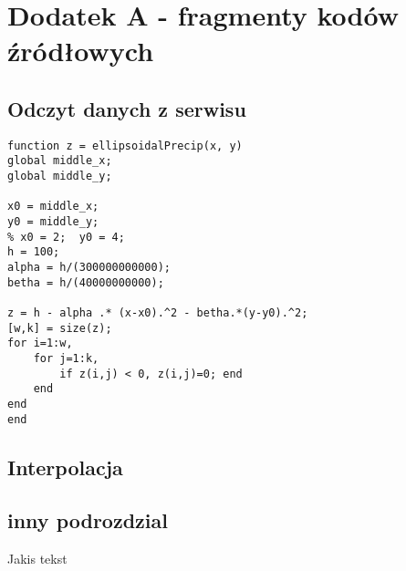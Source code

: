 \chapter{Dodatek A - fragmenty kodów źródłowych}
\label{cha:dodatek_A}
\section{Odczyt danych z serwisu}

\begin{lstlisting}
function z = ellipsoidalPrecip(x, y)
global middle_x;
global middle_y;

x0 = middle_x;
y0 = middle_y;
% x0 = 2;  y0 = 4;
h = 100;
alpha = h/(300000000000); 
betha = h/(40000000000);

z = h - alpha .* (x-x0).^2 - betha.*(y-y0).^2;
[w,k] = size(z);
for i=1:w,
    for j=1:k,
        if z(i,j) < 0, z(i,j)=0; end
    end
end
end
\end{lstlisting}


\label{sec:kod_odczyt_danych}
\section{Interpolacja}
\section{inny podrozdzial}
Jakis tekst \cite{Alvis2011}